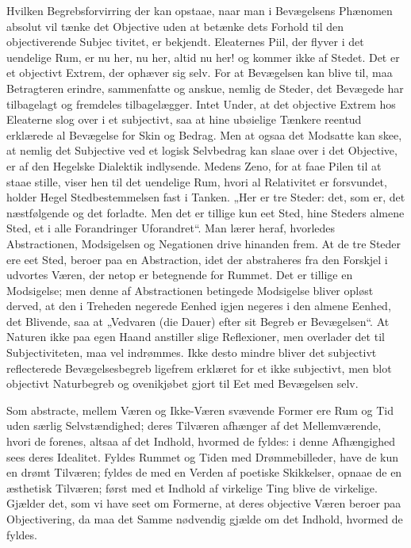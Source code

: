 \documentclass[12pt,a4paper]{book}
\begin{document}
Hvilken Begrebsforvirring der kan opstaae, naar man i Bevægelsens
Phænomen absolut vil tænke det Objective uden at betænke dets Forhold
til den objectiverende Subjec\-%
tivitet, er bekjendt. Eleaternes Piil, der flyver i det uendelige Rum,
er nu her, nu her, altid nu her! og kommer ikke af Stedet. Det er et
objectivt Extrem, der ophæver sig selv. For at Bevægelsen kan blive
til, maa Betragteren erindre, sammenfatte og anskue, nemlig de Steder,
det Bevægede har tilbagelagt og fremdeles tilbagelægger. Intet Under,
at det objective Extrem hos Eleaterne slog over i et subjectivt, saa at
hine ubøielige Tænkere reentud erklærede al Bevægelse for Skin og
Bedrag. Men at ogsaa det Modsatte kan skee, at nemlig det Subjective
ved et logisk Selvbedrag kan slaae over i det Objective, er af den
Hegelske Dialektik indlysende. Medens Zeno, for at faae Pilen til at
staae stille, viser hen til det uendelige Rum, hvori al Relativitet er
forsvundet, holder Hegel Stedbestemmelsen fast i Tanken. „Her er tre
Steder: det, som er, det næstfølgende og det forladte. Men det er
tillige kun eet Sted, hine Steders almene Sted, et i alle Forandringer
Uforandret“. Man lærer heraf, hvorledes Abstractionen, Modsigelsen og
Negationen drive hinanden frem. At de tre Steder ere eet Sted, beroer
paa en Abstraction, idet der abstraheres fra den Forskjel i udvortes
Væren, der netop er betegnende for Rummet. Det er tillige en
Modsigelse; men denne af Abstractionen betingede Modsigelse bliver
opløst derved, at den i Treheden negerede Eenhed igjen negeres i den
almene Eenhed, det Blivende, saa at „Vedvaren (die Dauer) efter sit
Begreb er Bevægelsen“. At Naturen ikke paa egen Haand anstiller slige
Reflexioner, men overlader det til Subjectiviteten, maa vel
indrømmes. Ikke desto mindre bliver det subjectivt reflecterede
Bevægelsesbegreb ligefrem erklæret for et ikke subjectivt, men blot
objectivt Naturbegreb og ovenikjøbet gjort til Eet med Bevægelsen selv.

Som abstracte, mellem Væren og Ikke-Væren svævende Former ere Rum og
Tid uden særlig Selvstændighed; deres Tilværen afhænger af det
Mellemværende, hvori de forenes,
altsaa af det Indhold, hvormed de fyldes: i denne Afhængighed sees
deres Idealitet. Fyldes Rummet og Tiden med Drømmebilleder, have de
kun en drømt Tilværen; fyldes de med en Verden af poetiske Skikkelser,
opnaae de en æsthetisk Tilværen; først med et Indhold af virkelige
Ting blive de virkelige. Gjælder det, som vi have seet om Formerne,
at deres objective Væren beroer paa Objectivering, da maa det Samme
nødvendig gjælde om det Indhold, hvormed de fyldes.
\end{document}

